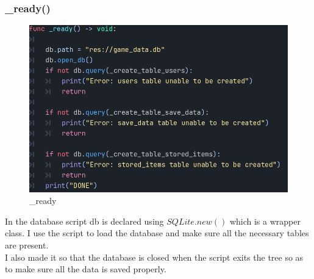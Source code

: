 \documentclass{article}
\begin{document}
        \subsubsection{\_ready()}
        \begin{figure}[H]
                \centering
                \includegraphics{images/development/database_ready.PNG}
                \caption{\_ready}
        \end{figure}
        In the database script db is declared using $SQLite.new()$ which is a wrapper class. I use the script to load the database and make sure all the necessary tables are present.\\
        I also made it so that the database is closed when the script exits the tree so as to make sure all the data is saved properly.\\
\end{document}
